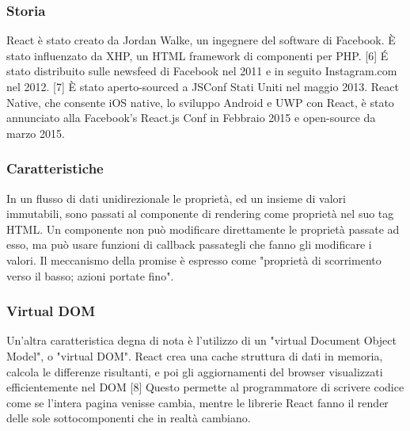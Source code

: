 \subsubsection{Storia}
React \`e stato creato da Jordan Walke, un ingegnere del software di Facebook. \`E stato influenzato da XHP, un HTML
framework di componenti per PHP. [6] \'E stato distribuito sulle newsfeed di Facebook nel 2011 e in seguito
Instagram.com nel 2012. [7] \`E stato aperto-sourced a JSConf Stati Uniti nel maggio 2013. React Native, che consente
 iOS native, lo sviluppo Android e UWP con React, è stato annunciato alla Facebook's React.js Conf  in
 Febbraio 2015 e open-source da marzo 2015.


\subsubsection{Caratteristiche}
In un flusso di dati unidirezionale le propriet\`a, ed un insieme di valori immutabili, sono passati al
componente di rendering come propriet\`a nel suo tag HTML.
Un componente non pu\`o modificare direttamente le propriet\`a passate ad esso, ma pu\`o usare funzioni di
callback passategli che fanno gli modificare i valori.
Il meccanismo della promise \`e espresso come "proprietà di scorrimento verso il basso; azioni portate fino".

\subsubsection{Virtual DOM}
Un'altra caratteristica degna di nota è l'utilizzo di un "virtual Document Object Model", o "virtual DOM".
React crea una cache struttura di dati in memoria, calcola le differenze risultanti, e poi gli aggiornamenti
del browser visualizzati efficientemente nel DOM [8] Questo permette al programmatore di scrivere codice come se
l'intera pagina venisse cambia, mentre le librerie React fanno il render delle sole sottocomponenti che in realtà cambiano.

